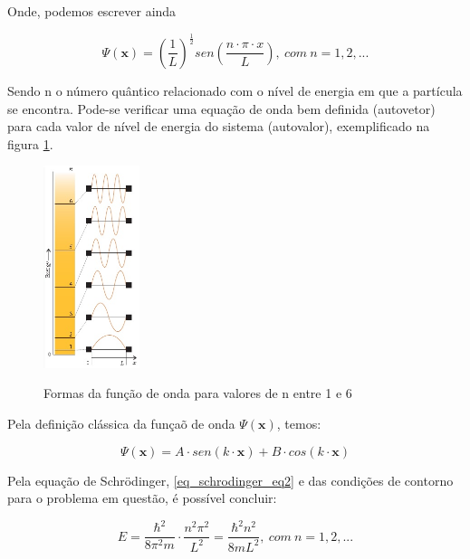     Onde, podemos escrever ainda

    \begin{equation}\label{eq_schrodinger_eq1}
      \Psi(\mathbf{x}) = \left(\frac{1}{L}\right)^\frac{1}{2} sen\left(\frac{n \cdot \pi \cdot x}{L}\right),\ com\ n = 1, 2, ...
    \end{equation}

    \par Sendo n o número quântico relacionado com o nível de energia em que a partícula se encontra. Pode-se verificar uma equação de onda bem definida (autovetor) para cada valor de nível de energia do sistema (autovalor), exemplificado na figura \ref{fig1}\cite{frustrado2}.

    \begin{figure}[h!]
      \caption{Formas da função de onda para valores de n entre 1 e 6}
      \centering
      \includegraphics[width=0.25\textwidth]{images/figura1.png}
      \label{fig1}
    \end{figure}

    \par Pela definição clássica da funçaõ de onda $\Psi(\mathbf{x})$, temos:

    \begin{equation}\label{eq_schrodinger_eq2}
        \Psi (\mathbf{x}) = A \cdot sen(k \cdot \mathbf{x}) + B \cdot cos(k \cdot \mathbf{x})
    \end{equation}

    \par Pela equação de Schrödinger, \eqref{eq_schrodinger_eq2} e das condições de contorno para o problema em questão, é possível concluir:

    \begin{equation}\label{eq_schrodinger_eq3}
      E = \frac{\hbar^2}{8 \pi^2 m} \cdot \frac{n^2\pi^2}{L^2} = \frac{\hbar^2 n^2}{8 m L^2},\ com\ n = 1, 2, ...
    \end{equation}

